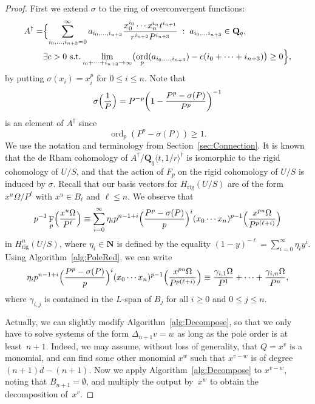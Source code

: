 \documentclass[a4paper,11pt]{article}
\numberwithin{equation}{section}
\newcommand{\NN}{\mathbf{N}} %
\newcommand{\QQ}{\mathbf{Q}} %
\DeclareMathOperator{\ord}{ord}          %
\DeclareMathOperator{\Frob}{F}           %
\providecommand{\Hrig}{H_{\text{rig}}}  %
\theoremstyle{definition}
\begin{document}
\begin{proof}
First we extend $\sigma$ to the ring of overconvergent functions:
\begin{align*}
A^{\dag} =
&\Bigl\{ \sum_{i_0,\dotsc,i_{n+3}=0}^{\infty} a_{i_0, \dotsc, i_{n+3}} 
\frac{x_0^{i_0} \dotsm x_n^{i_{n}}t^{i_{n+1}}}{r^{i_{n+2}} P^{i_{n+3}}} \; : \;
a_{i_0, \dotsc i_{n+3}} \in \QQ_q, \; \\ 
&\exists c > 0 \text{ s.t.} \lim_{i_0+\dotsb+i_{n+3} \rightarrow \infty} \bigl(\ord_p(a_{i_0, \dotsc, i_{n+3}} ) - 
c(i_0+\dotsb+i_{n+3})\bigr) \geq 0 \Bigr\},
\end{align*}
by putting $\sigma(x_i) = x_i^p$ for $0 \leq i \leq n$. Note that
\begin{equation*}
\sigma\Bigl(\frac{1}{P}\Bigr) = 
    P^{-p} \biggl( 1-\frac{P^p-\sigma(P)}{P^p} \biggr)^{-1}
\end{equation*}
is an element of $A^{\dag}$ since 
\begin{equation*}
\ord_p(P^p-\sigma(P)) \geq 1.
\end{equation*}
We use the notation and terminology from Section~\ref{sec:Connection}.
It is known that the de Rham cohomology of 
$A^{\dag}/\QQ_q \langle t,1/r \rangle^{\dag}$ 
is isomorphic to the rigid cohomology of $U/S$, and that the action of 
$F_p$ on the rigid cohomology of $U/S$ is induced by $\sigma$. Recall
that our basis vectors for $\Hrig(U/S)$ 
are of the form $x^u \Omega / P^{\ell}$ with $x^u \in B_{\ell}$ and 
$\ell \leq n$.  We observe that
\begin{equation*}
p^{-1} \Frob_p \Bigl(\frac{x^u \Omega}{P^{\ell}} \Bigr) \equiv
\sum_{i=0}^{\infty} \eta_i p^{n-1+i} \Bigl(\frac{P^p-\sigma(P)}{p} \Bigr)^i 
(x_0 \dotsm x_n)^{p-1} \Bigl( \frac{x^{pu} \Omega}{P^{p(\ell+i)}} \Bigr)
\end{equation*}
in $\Hrig^n(U/S)$, where $\eta_i \in \NN$ is defined by the equality 
$(1-y)^{-\ell} = \sum_{i=0}^{\infty} \eta_i y^i$.
Using Algorithm~\ref{alg:PoleRed}, we can write
\begin{equation} \label{eqn:Froblift}
\eta_i p^{n-1+i} \Bigl(\frac{P^p-\sigma(P)}{p} \Bigr)^i 
(x_0 \dotsm x_n)^{p-1} \Bigl( \frac{x^{pu} \Omega}{P^{p(\ell+i)}} \Bigr) \equiv
\frac{\gamma_{i,1} \Omega}{P^1}+\dotsb+\frac{\gamma_{i,n} \Omega}{P^n},
\end{equation}
where $\gamma_{i,j}$ is contained in the $L$-span of $B_j$ for all $i \geq 0$ and 
$0 \leq j \leq n$. 

Actually, we can slightly modify 
Algorithm~\ref{alg:Decompose}, so that we only have to solve systems of the 
form $\Delta_{n+1} v = w$ as long as the pole order is at least~$n+1$.  
Indeed, we may assume, without loss of generality, that $Q=x^v$ is a monomial, 
and can find some other monomial $x^w$ such that $x^{v-w}$ is of degree 
$(n+1)d-(n+1)$. Now we apply Algorithm~\ref{alg:Decompose} to $x^{v-w}$, 
noting that $B_{n+1}=\emptyset$, and multiply the output by~$x^w$ to obtain 
the decomposition of~$x^v$.


\end{proof}
\end{document}
